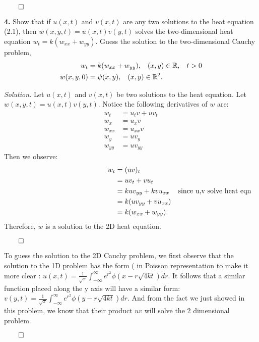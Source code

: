 \documentclass{article}
\begin{document}
\begin{flushright}
\(\qed\) 
\end{flushright} 




\newpage
\textbf{4.} Show that if \( u(x,t) \) and \(v(x,t) \) are any two solutions to the heat equation (2.1), then \( w(x,y,t) = u(x,t)v(y,t)\) solves the two-dimensional heat equation \( w_t = k(w_{xx} +w_{yy})\). Guess the solution to the two-dimensional Cauchy problem, 
\begin{align*}
w_t &= k(w_{xx} + w_{yy}), \hspace{3mm} (x,y) \in \mathbb{R}, \hspace{3mm} t>0 \\
w(x,y,0)&= \psi(x,y), \hspace{3mm} (x,y) \in \mathbb{R}^2. 
\end{align*}


\vspace{3mm}
\textit{Solution.} Let  \( u(x,t) \) and \(v(x,t) \) be two solutions to the heat equation. Let \( w(x,y,t) = u(x,t)v(y,t)\). Notice the following derivatives of \(w\) are:
\begin{align*}
w_t &= u_tv + uv_t \\
w_x &= u_xv \\
w_{xx} &= u_{xx}v\\
w_y &= uv_y \\
w_{yy} &= uv_{yy}
\end{align*} 
Then we observe:
\begin{align*}
\hspace{45mm} && w_t &= (uv)_t   &&\\
&& &= uv_t + vu_t  && \\
&& &= kuv_{yy} + kvu_{xx}  &\text{since u,v solve heat eqn}& \\
&& &= k(uv_{yy} + vu_{xx})  &&\\
&& &= k( w_{xx} + w_{yy} ).
\end{align*} 
Therefore, \(w\) is a solution to the 2D heat equation. 
\begin{flushright}
\(\qed\)
\end{flushright}


To guess the solution to the 2D Cauchy problem, we first observe that the solution to the 1D problem has the form ( in Poisson representation to make it more clear : \( u(x,t) = \frac{1}{\sqrt{\pi}} \int_{-\infty}^{\infty} e^{r^2} \phi(x-r \sqrt{4kt} ) dr   \).  It follows that a similar function placed along the y axis will have a similar form: \( v(y,t) =  \frac{1}{\sqrt{\pi}} \int_{-\infty}^{\infty} e^{r^2} \phi(y-r \sqrt{4kt} ) dr   \). And from the fact we just showed in this problem, we know that their product \(uv\) will solve the 2 dimensional problem. 
 \begin{flushright}
\(\qed\)
\end{flushright}
 
\end{document}
